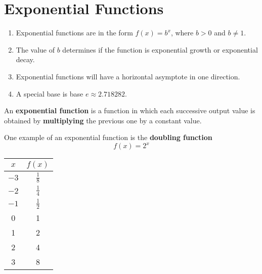 \documentclass{article}
\newcounter{example}[section]
\begin{document}
\section*{Exponential Functions}

\begin{tcolorbox}[colframe=orange!70!white, coltitle=black, title=\textbf{Summary}]
\begin{enumerate}
    \item Exponential functions are in the form $f(x) = b^x$, where $b>0$ and $b\neq 1$.
    \item The value of $b$ determines if the function is exponential growth or exponential decay.
    \item Exponential functions will have a horizontal asymptote in one direction.
    \item A special base is base $e \approx 2.718282$.
\end{enumerate}
\end{tcolorbox}
\vspace{0.5in}

\begin{tcolorbox}[colframe=green!60!black, title=\textbf{Exponential Function}]
An \textbf{exponential function} is a function in which each successive output value is obtained by {\color{violet}\textbf{multiplying}} the previous one by a constant value.
\end{tcolorbox}
\vfill

One example of an exponential function is the {\color{blue}\textbf{doubling function}}
\[ f(x) = 2^x \]
\vspace{0.25in}

\begin{minipage}{0.4\textwidth}
\end{minipage}
\hspace{1cm}
\begin{minipage}{0.25\textwidth}
\setlength{\extrarowheight}{5pt}
\begin{tabular}{c|c}
    $x$ & $f(x)$ \\ \hline 
    $-3$ & $\tfrac{1}{8}$ \\[5pt]
    $-2$ & $\tfrac{1}{4}$ \\[5pt]
    $-1$ & $\tfrac{1}{2}$ \\[5pt]
    0   &   1   \\[5pt]
    1   &   2   \\[5pt]
    2   &   4   \\[5pt]
    3   &   8   
\end{tabular}
\end{minipage}
\vspace{0.5in}
\end{document}
